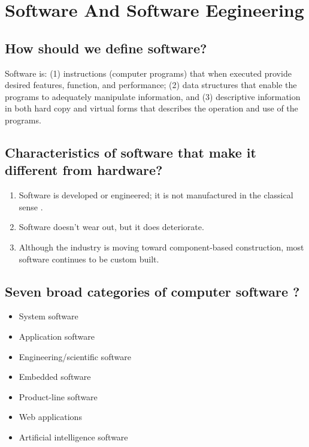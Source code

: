 \documentclass[12pt]{article}
\begin{document}
\tableofcontents


\newpage

\section{Software And Software Eegineering}

\subsection{How should we define software?}

Software is: (1) instructions (computer programs) that when executed provide desired
features, function, and performance; (2) data structures that enable the programs to adequately manipulate information, and (3) descriptive information in both hard copy and
virtual forms that describes the operation and use of the programs.


\subsection{Characteristics of software that make it different from hardware?}

\begin{enumerate}
	\item Software is developed or engineered; it is not manufactured in the classical sense .
	\item Software doesn’t wear out, but it does
deteriorate.
	\item Although the industry is moving toward component-based construction, most
software continues to be custom built.
\end{enumerate}


\subsection{Seven broad categories of computer software ?}

\begin{itemize}
	\item System software
	\item Application software
	\item Engineering/scientific software
	\item Embedded software
	\item Product-line software
	\item Web applications
	\item Artificial intelligence software
\end{itemize}
\end{document}
